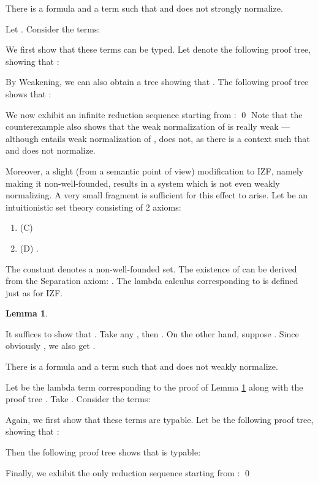 \documentclass{LMCS}
\newtheorem{lemma}[thm]{Lemma}
\newcommand{\iizfr}{IZF}
\begin{document}
\begin{thm}
There is a formula  and a term  such that  and 
does not strongly normalize.
\end{thm}
\proof Let . Consider the terms:

We first show that these terms can be typed. Let  denote the following proof tree, showing that 
:

By Weakening, we can also obtain a tree  showing that . The following proof tree shows that :

We now exhibit an infinite reduction sequence starting from :
\qed
Note that the counterexample also shows that the weak
normalization of  is really weak --- although  entails weak 
normalization of ,  does not, as there is a context  such that 
 and  does not normalize. 

Moreover, a slight (from a semantic point of view) modification to \iizfr,
namely making it non-well-founded, results in a system which is not even
weakly normalizing. A very small fragment is sufficient for this effect to
arise. Let  be an intuitionistic set theory consisting of 2 axioms:

\begin{enumerate}[]
\item (C) 
\item (D) .
\end{enumerate}

The constant  denotes a non-well-founded set. The existence of  can
be derived from the Separation axiom: . The lambda calculus corresponding to  is defined just as for \iizfr.

\begin{lemma}\label{dc}

\end{lemma}
\proof It suffices to show that . Take any , then . On the
other hand, suppose . Since obviously , we
also get .\proof


\begin{thm}\label{notweakly}
There is a formula  and a term  such that  and 
does not weakly normalize.
\end{thm}
\proof Let  be the lambda term corresponding to the proof of Lemma \ref{dc} along
with the proof tree . Take . Consider the terms:

Again, we first show that these terms are typable. Let  be the following proof
tree, showing that :

Then the following proof tree shows that  is typable:

Finally, we exhibit the only reduction sequence starting from :
\qed
\end{document}
